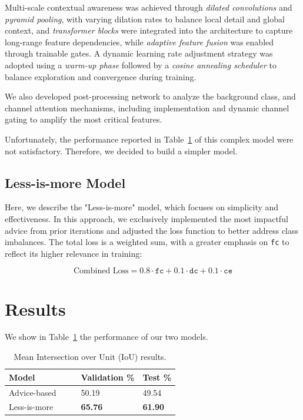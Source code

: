 \documentclass[11pt]{article}
\begin{document}
\begin{multicols*}{2}
Multi-scale contextual awareness was achieved through \emph{dilated convolutions} and \emph{pyramid pooling}, with varying dilation rates to balance local detail and global context, and \emph{transformer blocks} were integrated into the architecture to capture long-range feature dependencies, while \emph{adaptive feature fusion} was enabled through trainable gates. A dynamic learning rate adjustment strategy was adopted using a \emph{warm-up phase} followed by a \emph{cosine annealing scheduler} to balance exploration and convergence during training. 

We also developed post-processing network to analyze the background class, and channel attention mechanisms, including  implementation and dynamic channel gating to amplify the most critical features.

    Unfortunately, the performance reported in Table~\ref{tab:iou} of this complex model were not satisfactory. Therefore, we decided to build a simpler model.

    \subsection{Less-is-more Model}
    
    Here, we describe the "Less-is-more" model, which focuses on simplicity and effectiveness. In this approach, we exclusively implemented the most impactful advice from prior iterations and adjusted the loss function to better address class imbalances. The total loss is a weighted sum, with a greater emphasis on \texttt{fc} to reflect its higher relevance in training:  

    \begin{equation*}
    \text{Combined Loss} = 0.8 \cdot \texttt{fc} + 0.1 \cdot \texttt{dc} + 0.1 \cdot \texttt{ce}
    \end{equation*}
    

    \section{Results} %
    \label{sec:results}

    We show in Table~\ref{tab:iou} the performance of our two models.
   
    \begin{table}[H]
        \centering
        \setlength{\tabcolsep}{3pt}
        \caption{Mean Intersection over Unit (IoU) results.}
        \label{tab:iou}
        \begin{tabularx}{\linewidth}{lXX}
            \toprule
            Model & Validation \% & Test \% \\
            \midrule
            Advice-based$\qquad$ & 50.19 & 49.54 \\
            Less-is-more & \textbf{65.76} & \textbf{61.90} \\
            \bottomrule
        \end{tabularx}
    \end{table}
    

\end{multicols*}
\end{document}
